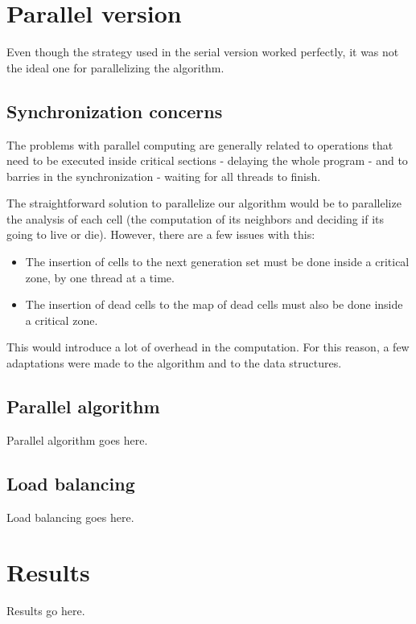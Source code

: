 \documentclass[11pt,english]{article}
\begin{document}
\section{Parallel version}

Even though the strategy used in the serial version worked perfectly, it was 
not the ideal one for parallelizing the algorithm. 

\subsection{Synchronization concerns}

The problems with parallel computing are generally related to operations that 
need to be executed inside critical sections - delaying the whole program - and 
to barries in the synchronization - waiting for all threads to finish. 

The straightforward solution to parallelize our algorithm would be to 
parallelize the analysis of each cell (the computation of its neighbors and 
deciding if its going to live or die). However, there are a few issues with 
this:

\begin{itemize}
    \item{The insertion of cells to the next generation set must be done 
        inside a critical zone, by one thread at a time.}
    \item{The insertion of dead cells to the map of dead cells must also be 
        done inside a critical zone.}
\end{itemize}

This would introduce a lot of overhead in the computation. For this reason, a 
few adaptations were made to the algorithm and to the data structures.

\subsection{Parallel algorithm}

Parallel algorithm goes here.

\subsection{Load balancing}

Load balancing goes here.

\section{Results}

Results go here.
\end{document}
